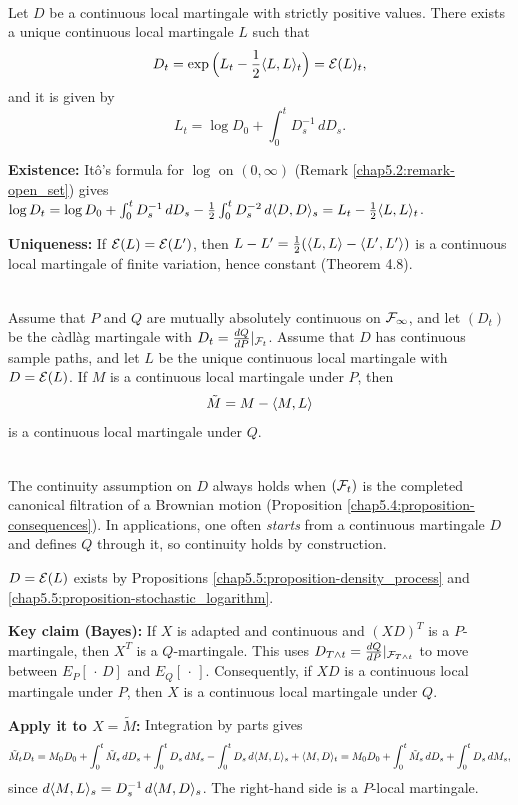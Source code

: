 \begin{proposition}\label{chap5.5:proposition-stochastic_logarithm}
\\
Let $D$ be a continuous local martingale with strictly positive values. There exists a unique continuous local martingale $L$ such that
$$D_t=\exp\Big(L_t-\frac12\langle L,L\rangle_t\Big)=\mathcal{E}(L)_t,$$
and it is given by
$$L_t=\log D_0+\int_0^tD_s^{-1}\,dD_s.$$
\end{proposition}

\begin{proofidea}
\textbf{Existence:} Itô's formula for $\log$ on $(0,\infty)$ (Remark \ref{chap5.2:remark-open_set}) gives $\log D_t=\log D_0+\int_0^tD_s^{-1}\,dD_s-\frac12\int_0^tD_s^{-2}\,d\langle D,D\rangle_s=L_t-\frac12\langle L,L\rangle_t$.

\textbf{Uniqueness:} If $\mathcal{E}(L)=\mathcal{E}(L')$, then $L-L'=\frac12(\langle L,L\rangle-\langle L',L'\rangle)$ is a continuous local martingale of finite variation, hence constant (Theorem 4.8).
\end{proofidea}

\begin{theorem}[Girsanov]\label{chap5.5:theorem-girsanov}
\\
Assume that $P$ and $Q$ are mutually absolutely continuous on $\mathcal{F}_\infty$, and let $(D_t)$ be the càdlàg martingale with $D_t=\frac{dQ}{dP}|_{\mathcal{F}_t}$. Assume that $D$ has continuous sample paths, and let $L$ be the unique continuous local martingale with $D=\mathcal{E}(L)$. If $M$ is a continuous local martingale under $P$, then
$$\tilde M=M-\langle M,L\rangle$$
is a continuous local martingale under $Q$.
\end{theorem}

\begin{remark}
\\
The continuity assumption on $D$ always holds when $(\mathcal{F}_t)$ is the completed canonical filtration of a Brownian motion (Proposition \ref{chap5.4:proposition-consequences}). In applications, one often \textit{starts} from a continuous martingale $D$ and defines $Q$ through it, so continuity holds by construction.
\end{remark}

\begin{proofidea}
$D=\mathcal{E}(L)$ exists by Propositions \ref{chap5.5:proposition-density_process} and \ref{chap5.5:proposition-stochastic_logarithm}.

\textbf{Key claim (Bayes):} If $X$ is adapted and continuous and $(XD)^T$ is a $P$-martingale, then $X^T$ is a $Q$-martingale. This uses $D_{T\wedge t}=\frac{dQ}{dP}|_{\mathcal{F}_{T\wedge t}}$ to move between $E_P[\,\cdot\,D]$ and $E_Q[\,\cdot\,]$. Consequently, if $XD$ is a continuous local martingale under $P$, then $X$ is a continuous local martingale under $Q$.

\textbf{Apply it to $X=\tilde M$:} Integration by parts gives
$$\tilde M_tD_t=M_0D_0+\int_0^t\tilde M_s\,dD_s+\int_0^tD_s\,dM_s-\int_0^tD_s\,d\langle M,L\rangle_s+\langle M,D\rangle_t=M_0D_0+\int_0^t\tilde M_s\,dD_s+\int_0^tD_s\,dM_s,$$
since $d\langle M,L\rangle_s=D_s^{-1}\,d\langle M,D\rangle_s$. The right-hand side is a $P$-local martingale.
\end{proofidea}

